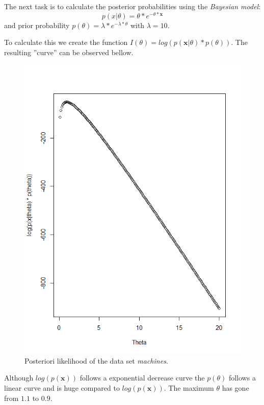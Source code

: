 \documentclass[a4paper,12pt]{article}
\begin{document}
The next task is to calculate the posterior probabilities using the \textit{Bayesian model}: 
\begin{equation}
  p(x|\theta) = \theta * e^{-\theta * \mathbf{x}}
\end{equation}
and prior probability \(p(\theta) = \lambda * e^{-\lambda*\theta} \) with \( \lambda = 10\).  

To calculate this we create the function \(I(\theta) = log(p(\textbf{x}|\theta) * p(\theta))\).  The resulting ''curve'' can be observed bellow.
\begin{figure}[H]
\centering
\begin{minipage}[]{0.5\textwidth}
  \includegraphics[width=\textwidth]{figures/Lab1_A2_post.png}  
  \caption{Posteriori likelihood of the data set \textit{machines}.\label{fig:Postpriori likelihood of the data set machines} }
 \end{minipage}
\end{figure}
Although \( log(p(\mathbf{x}))\) follows a exponential decrease curve the \(p(\theta)\) follows a linear curve and is huge compared to \( log(p(\mathbf{x}))\). The maximum \(\theta\) has gone from \(1.1\) to \(0.9\).
\end{document}
